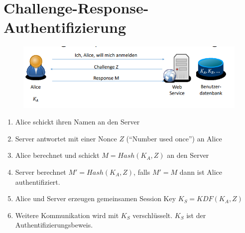 \section{Challenge-Response-Authentifizierung}
\begin{figure}[H]
	\begin{center}
		\includegraphics[scale=0.8]{Resources/ChallengeResponseAuth.png}
		\caption{}
		\label{fig:ChallengeResponeAuth.png}
	\end{center}
\end{figure}

\begin{enumerate}
	\item Alice schickt ihren Namen an den Server
	\item Server antwortet mit einer Nonce $Z$ (\enquote{Number used once}) an Alice
	\item Alice berechnet und schickt $M = Hash(K_A, Z)$ an den Server
	\item Server berechnet $M' = Hash(K_A, Z)$, falls $M' = M$ dann ist Alice authentifiziert.
	\item Alice und Server erzeugen gemeinsamen Session Key $K_S = KDF(K_A, Z)$
	\item Weitere Kommunikation wird mit $K_S$ verschlüsselt. $K_S$ ist der Authentifizierungsbeweis.
\end{enumerate}












